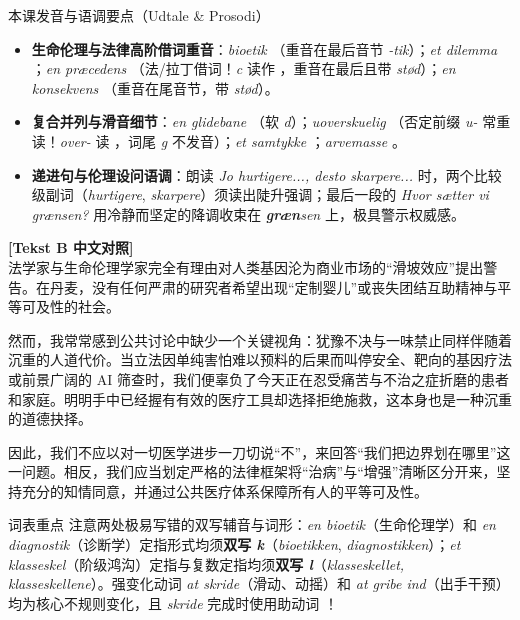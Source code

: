 \begin{tipbox}{本课发音与语调要点（Udtale \& Prosodi）}
\begin{itemize}
  \item \textbf{生命伦理与法律高阶借词重音}：\textit{bioetik} （重音在最后音节 \textit{-tik}）；\textit{et dilemma} ；\textit{en præcedens} （法/拉丁借词！\textit{c} 读作 ，重音在最后且带 \textit{stød}）；\textit{en konsekvens} （重音在尾音节，带 \textit{stød}）。
  \item \textbf{复合并列与滑音细节}：\textit{en glidebane} （软 \textit{d}）；\textit{uoverskuelig} （否定前缀 \textit{u-} 常重读！\textit{over-} 读 ，词尾 \textit{g} 不发音）；\textit{et samtykke} ；\textit{arvemasse} 。
  \item \textbf{递进句与伦理设问语调}：朗读 \textit{Jo hurtigere..., desto skarpere...} 时，两个比较级副词（\textit{hurtigere}, \textit{skarpere}）须读出陡升强调；最后一段的 \textit{Hvor sætter vi grænsen?} 用冷静而坚定的降调收束在 \textit{\textbf{græn}sen} 上，极具警示权威感。
\end{itemize}
\end{tipbox}

\begin{transbox}
\small
\textbf{\color{NCDTeal}[Tekst B 中文对照]}\\
法学家与生命伦理学家完全有理由对人类基因沦为商业市场的“滑坡效应”提出警告。在丹麦，没有任何严肃的研究者希望出现“定制婴儿”或丧失团结互助精神与平等可及性的社会。

然而，我常常感到公共讨论中缺少一个关键视角：犹豫不决与一味禁止同样伴随着沉重的人道代价。当立法因单纯害怕难以预料的后果而叫停安全、靶向的基因疗法或前景广阔的 AI 筛查时，我们便辜负了今天正在忍受痛苦与不治之症折磨的患者和家庭。明明手中已经握有有效的医疗工具却选择拒绝施救，这本身也是一种沉重的道德抉择。

因此，我们不应以对一切医学进步一刀切说“不”，来回答“我们把边界划在哪里”这一问题。相反，我们应当划定严格的法律框架将“治病”与“增强”清晰区分开来，坚持充分的知情同意，并通过公共医疗体系保障所有人的平等可及性。
\end{transbox}


\begin{tipbox}{词表重点}
注意两处极易写错的双写辅音与词形：\textit{en bioetik}（生命伦理学）和 \textit{en diagnostik}（诊断学）定指形式均须\textbf{双写 \textit{k}}（\textit{bioetikken}, \textit{diagnostikken}）；\textit{et klasseskel}（阶级鸿沟）定指与复数定指均须\textbf{双写 \textit{l}}（\textit{klasseskellet, klasseskellene}）。强变化动词 \textit{at skride}（滑动、动摇）和 \textit{at gribe ind}（出手干预）均为核心不规则变化，且 \textit{skride} 完成时使用助动词 ！
\end{tipbox}

